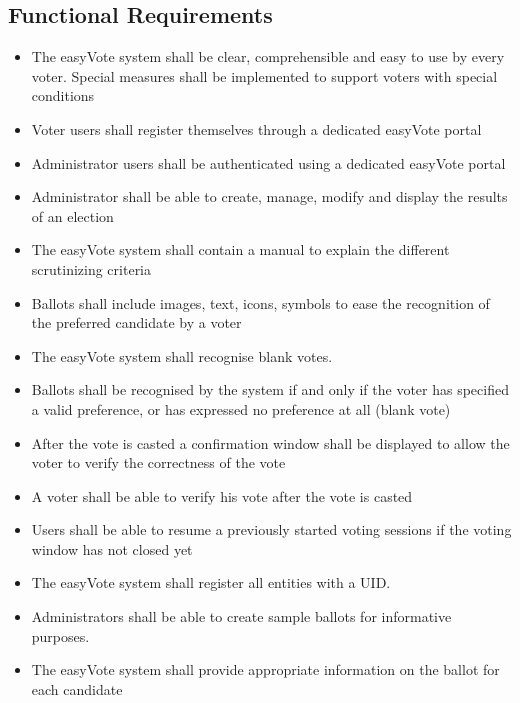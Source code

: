 \documentclass[11pt, oneside]{article}   	%
\begin{document}
\subsection{Functional Requirements}
\begin{itemize}
\item The easyVote system shall be clear, comprehensible and easy to use by every voter. Special measures shall be implemented to support voters with special conditions
\item Voter users shall register themselves through a dedicated easyVote portal 
\item Administrator users shall be authenticated using a dedicated easyVote portal
\item Administrator shall be able to create, manage, modify and display the results of an election
\item The easyVote system shall contain a manual to explain the different scrutinizing criteria
\item Ballots shall include images, text, icons, symbols to ease the recognition of the preferred candidate by a voter
\item The easyVote system shall recognise blank votes.
\item Ballots shall be recognised by the system if and only if the voter has specified a valid preference, or has expressed no preference at all (blank vote)
\item After the vote is casted a confirmation window shall be displayed to allow the voter to verify the correctness of the vote
\item A voter shall be able to verify his vote after the vote is casted
\item Users shall be able to resume a previously started voting sessions if the voting window has not closed yet
\item The easyVote system shall register all entities with a UID.
\item Administrators shall be able to create sample ballots for informative purposes.
\item The easyVote system shall provide appropriate information on the ballot for each candidate
\end{itemize}

\pagebreak
\end{document}
